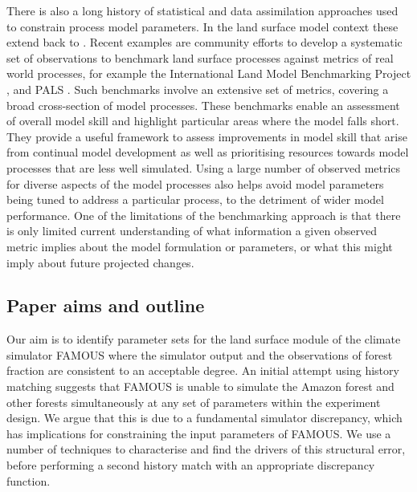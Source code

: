 \documentclass[esd, manuscript]{copernicus}
\begin{document}
There is also a long history of statistical and data assimilation approaches used to constrain process model parameters. In the land surface model context these extend back to \cite{sellers1996revised}. Recent examples are community efforts to develop a systematic set of observations to benchmark land surface processes against metrics of real world processes, for example the International Land Model Benchmarking Project \citep{luo2012framework}, and PALS \citep{abramowitz2012benchmarking}.  Such benchmarks involve an extensive set of metrics, covering a broad cross-section of model processes.  These benchmarks enable an assessment of overall model skill and highlight particular areas where the model falls short. They provide a useful framework to assess improvements in model skill that arise from continual model development as well as prioritising resources towards model processes that are less well simulated.  Using a large number of observed metrics for diverse aspects of the model processes also helps avoid model parameters being tuned to address a particular process, to the detriment of wider model performance. One of the limitations of the benchmarking approach is that there is only limited current understanding of what information a given observed metric implies about the model formulation or parameters, or what this might imply about future projected changes.

\subsection{Paper aims and outline}

Our aim is to identify parameter sets for the land surface module of the climate simulator FAMOUS where the simulator output and the observations of forest fraction are consistent to an acceptable degree.  An initial attempt using history matching suggests that FAMOUS is unable to simulate the Amazon forest and other forests simultaneously at any set of parameters within the experiment design. We argue that this is due to a fundamental simulator discrepancy, which has implications for constraining the input parameters of FAMOUS. We use a number of techniques to characterise and find the drivers of this structural error, before performing a second history match with an appropriate discrepancy function.
\end{document}
